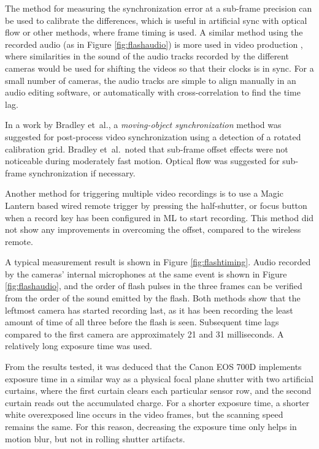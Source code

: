

The method for measuring the synchronization error at a sub-frame precision can be used to calibrate the differences, which is useful in artificial sync with optical flow or other methods, where frame timing is used.
A similar method using the recorded audio (as in Figure \ref{fig:flashaudio}) is more used in video production \cite{pluraleyes,premierepromerge}, where similarities in the sound of the audio tracks recorded by the different cameras would be used for shifting the videos so that their clocks is in sync.
For a small number of cameras, the audio tracks are simple to align manually in an audio editing software, or automatically with cross-correlation to find the time lag.

In a work by Bradley et~al., a \emph{moving-object synchronization} method \cite{bradley2008markerless} was suggested for post-process video synchronization using a detection of a rotated calibration grid.
Bradley et~al.\ noted that sub-frame offset effects were not noticeable during moderately fast motion.
Optical flow was suggested for sub-frame synchronization if necessary.

Another method for triggering multiple video recordings is to use a Magic Lantern based wired remote trigger by pressing the half-shutter, or focus button when a record key has been configured in ML to start recording.
This method did not show any improvements in overcoming the offset, compared to the wireless remote.

A typical measurement result is shown in Figure \ref{fig:flashtiming}.
Audio recorded by the cameras' internal microphones at the same event is shown in Figure \ref{fig:flashaudio}, and the order of flash pulses in the three frames can be verified from the order of the sound emitted by the flash.
Both methods show that the leftmost camera has started recording last, as it has been recording the least amount of time of all three before the flash is seen.
Subsequent time lags compared to the first camera are approximately 21 and 31 milliseconds.
A relatively long exposure time was used.

From the results tested, it was deduced that the Canon EOS 700D implements exposure time in a similar way as a physical focal plane shutter with two artificial curtains, where the first curtain clears each particular sensor row, and the second curtain reads out the accumulated charge.
For a shorter exposure time, a shorter white overexposed line occurs in the video frames, but the scanning speed remains the same.
For this reason, decreasing the exposure time only helps in motion blur, but not in rolling shutter artifacts.

